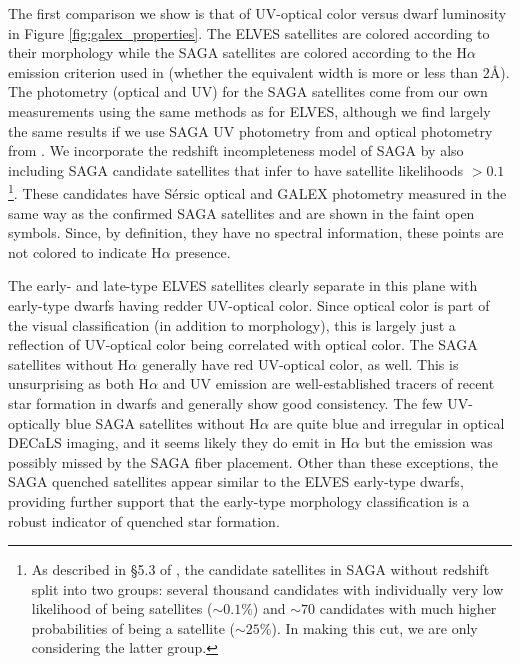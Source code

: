 \documentclass[twocolumn]{aastex62}
\begin{document}
The first comparison we show is that of UV-optical color versus dwarf luminosity in Figure \ref{fig:galex_properties}. The ELVES satellites are colored according to their morphology while the SAGA satellites are colored according to the H$\alpha$ emission criterion used in \citet{mao2020} (whether the equivalent width is more or less than $2$\AA). The photometry (optical and UV) for the SAGA satellites come from our own measurements using the same methods as for ELVES, although we find largely the same results if we use SAGA UV photometry from \citet{karunakaran2021} and optical photometry from \citet{mao2020}. We incorporate the redshift incompleteness model of SAGA by also 
including SAGA candidate satellites that \citet{mao2020} infer to have satellite likelihoods $>0.1$\footnote{As described in \S5.3 of \citet{mao2020}, the candidate satellites in SAGA without redshift split into two groups: several thousand candidates with individually very low likelihood of being satellites ($\sim0.1\%$) and $\sim70$ candidates with much higher probabilities of being a satellite ($\sim25$\%). In making this cut, we are only considering the latter group.}. These candidates have S\'{e}rsic optical and GALEX photometry measured in the same way as the confirmed SAGA satellites and are shown in the faint open symbols. Since, by definition, they have no spectral information, these points are not colored to indicate H$\alpha$ presence. 

The early- and late-type ELVES satellites clearly separate in this plane with early-type dwarfs having redder UV-optical color. Since optical color is part of the visual classification (in addition to morphology), this is largely just a reflection of UV-optical color being correlated with optical color. The SAGA satellites without H$\alpha$ generally have red UV-optical color, as well. This is unsurprising as both H$\alpha$ and UV emission are well-established tracers of recent star formation in dwarfs \citep{lee2009, karachentsev2013_sfr} and generally show good consistency. The few UV-optically blue SAGA satellites without H$\alpha$ are quite blue and irregular in optical DECaLS imaging, and it seems likely they do emit in H$\alpha$ but the emission was possibly missed by the SAGA fiber placement. Other than these exceptions, the SAGA quenched satellites appear similar to the ELVES early-type dwarfs, providing further support that the early-type morphology classification is a robust indicator of quenched star formation. 
\end{document}
